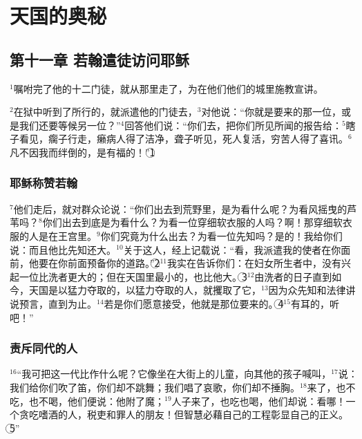 \section{天国的奥秘}


\subsection{第十一章 若翰遣徒访问耶稣}
$^{1}$\UL[耶稣]嘱咐完了他的十二门徒，就从那里走了，为在他们他们的城里施教宣讲。

$^{2}$\UL[若翰]在狱中听到了\UL[基督]所行的，就派遣他的门徒去，$^{3}$对他说：“你就是要来的那一位，或是我们还要等候另一位？”$^{4}$\UL[耶稣]回答他们说：“你们去，把你们所见所闻的报告给\UL[若翰]：$^{5}$瞎子看见，瘸子行走，癞病人得了洁净，聋子听见，死人复活，穷苦人得了喜讯。$^{6}$凡不因我而绊倒的，是有福的！”\textcircled{1}


\subsubsection{耶稣称赞若翰}
$^{7}$他们走后，\UL[耶稣]就对群众论\UL[若翰]说：“你们出去到荒野里，是为看什么呢？为看风摇曳的芦苇吗？$^{8}$你们出去到底是为看什么？为看一位穿细软衣服的人吗？啊！那穿细软衣服的人是在王宫里。$^{9}$你们究竟为什么出去？为看一位先知吗？是的！我给你们说：而且他比先知还大。$^{10}$关于这人，经上记载说：“看，我派遣我的使者在你面前，他要在你前面预备你的道路。”\textcircled{2}$^{11}$我实在告诉你们：在妇女所生者中，没有兴起一位比洗者\UL[若翰]更大的；但在天国里最小的，也比他大。\textcircled{3}$^{12}$由洗者\UL[若翰]的日子直到如今，天国是以猛力夺取的，以猛力夺取的人，就攫取了它，$^{13}$因为众先知和法律讲说预言，直到\UL[若翰]为止。$^{14}$若是你们愿意接受，他就是那位要来的\UL[厄里亚]。\textcircled{4}$^{15}$有耳的，听吧！”


\subsubsection{责斥同代的人}
$^{16}$“我可把这一代比作什么呢？它像坐在大街上的儿童，向其他的孩子喊叫，$^{17}$说：我们给你们吹了笛，你们却不跳舞；我们唱了哀歌，你们却不捶胸。$^{18}$\UL[若翰]来了，也不吃，也不喝，他们便说：他附了魔；$^{19}$人子来了，也吃也喝，他们却说：看哪！一个贪吃嗜酒的人，税吏和罪人的朋友！但智慧必藉自己的工程彰显自己的正义。\textcircled{5}”

